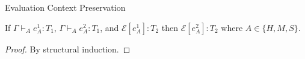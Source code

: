 \begin{lemma}{Evaluation Context Preservation}

\label{lemeva}

If $\Gamma\vdash_{A}e_{A}^{1}:T_{1}$, $\Gamma\vdash_{A}e_{A}^{2}:T_{1}$, and $\mathscr{E}[e_{A}^{1}]:T_{2}$ then $\mathscr{E}[e_{A}^{2}]:T_{2}$ where $A\in\lbrace H,M,S\rbrace$.

\begin{proof}

By structural induction.

\end{proof}

\end{lemma}
